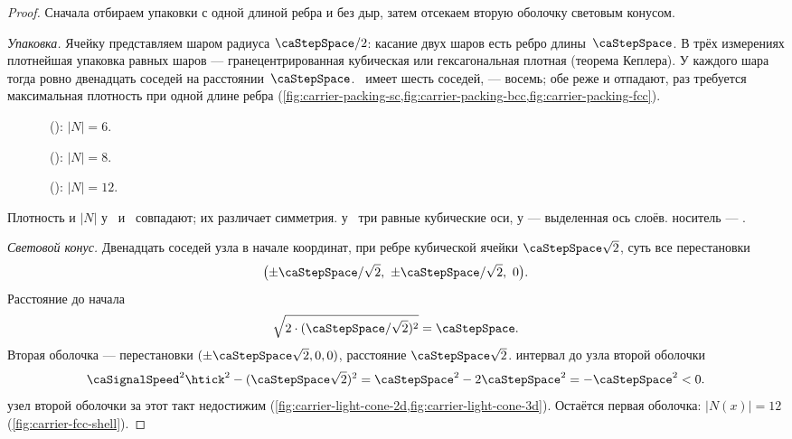 \begin{proof}
Сначала отбираем упаковки с одной длиной ребра и без дыр, затем отсекаем вторую оболочку световым конусом.

\emph{Упаковка.}
Ячейку представляем шаром радиуса $\caStepSpace/2$: касание двух шаров есть ребро длины~$\caStepSpace$.
В трёх измерениях плотнейшая упаковка равных шаров --- гранецентрированная кубическая или гексагональная плотная (теорема Кеплера).
У каждого шара тогда ровно двенадцать соседей на расстоянии~$\caStepSpace$.
\latPK\ имеет шесть соседей, \latOCK --- восемь; обе реже и отпадают, раз требуется максимальная плотность при одной длине ребра
(\cref{fig:carrier-packing-sc,fig:carrier-packing-bcc,fig:carrier-packing-fcc}).

\begin{figure}[htbp]
  \centering
  
  \caption{\latPK\ (\latPKshort): $|N|=6$.}
  \label{fig:carrier-packing-sc}
\end{figure}

\begin{figure}[htbp]
  \centering
  
  \caption{\latOCK\ (\latOCKshort): $|N|=8$.}
  \label{fig:carrier-packing-bcc}
\end{figure}

\begin{figure}[htbp]
  \centering
  
  \caption{\latGCK\ (\latGCKshort): $|N|=12$.}
  \label{fig:carrier-packing-fcc}
\end{figure}

Плотность и $|N|$ у \latGCKshort\ и \latGPUshort\ совпадают; их различает симметрия.
у \latGCKshort\ три равные кубические оси, у \latGPUshort --- выделенная ось слоёв.
\phence носитель --- \latGCK.

\emph{Световой конус.}
Двенадцать соседей узла в начале координат, при ребре кубической ячейки $\caStepSpace\sqrt{2}$, суть все перестановки
\[
  \bigl(\pm\caStepSpace/\sqrt{2},\ \pm\caStepSpace/\sqrt{2},\ 0\bigr).
\]
Расстояние до начала
\[
  \sqrt{2\cdot(\caStepSpace/\sqrt{2})^2}=\caStepSpace.
\]
Вторая оболочка --- перестановки $(\pm\caStepSpace\sqrt{2},0,0)$, расстояние $\caStepSpace\sqrt{2}$.
интервал до узла второй оболочки
\[
  \caSignalSpeed^2\htick^2-(\caStepSpace\sqrt{2})^2=\caStepSpace^2-2\caStepSpace^2=-\caStepSpace^2<0.
\]
\pfollows
узел второй оболочки за этот такт недостижим
(\cref{fig:carrier-light-cone-2d,fig:carrier-light-cone-3d}).
Остаётся первая оболочка: $|N(x)|=12$ (\cref{fig:carrier-fcc-shell}).


\end{proof}
